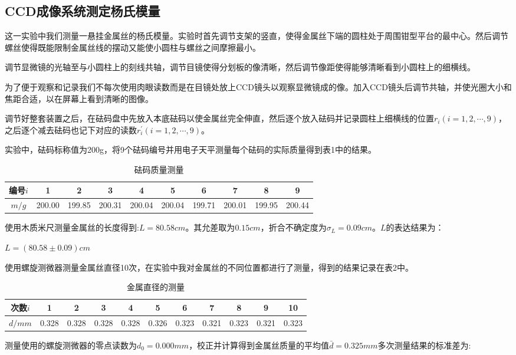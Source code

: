 \documentclass[a4 paper,12pt]{article}
\begin{document}
\subsection{CCD成像系统测定杨氏模量}
这一实验中我们测量一悬挂金属丝的杨氏模量。实验时首先调节支架的竖直，使得金属丝下端的圆柱处于周围钳型平台的最中心。然后调节螺丝使得既能限制金属丝线的摆动又能使小圆柱与螺丝之间摩擦最小。
\par 调节显微镜的光轴至与小圆柱上的刻线共轴，调节目镜使得分划板的像清晰，然后调节像距使得能够清晰看到小圆柱上的细横线。
\par 为了便于观察和记录我们不每次使用肉眼读数而是在目镜处放上CCD镜头以观察显微镜成的像。加入CCD镜头后调节共轴，并使光圈大小和焦距合适，以在屏幕上看到清晰的图像。
\par 调节好整套装置之后，在砝码盘中先放入本底砝码以使金属丝完全伸直，然后逐个放入砝码并记录圆柱上细横线的位置$r_{i}(i=1,2,\cdots,9)$，之后逐个减去砝码也记下对应的读数$r_{i}^{\prime}(i=1,2,\cdots,9)$。
\par 实验中，砝码标称值为200g，将9个砝码编号并用电子天平测量每个砝码的实际质量得到表1中的结果。
\begin{table}[H]
	\caption{砝码质量测量}
	\label{砝码质量测量}
	\centering
	\begin{tabular}{c|*{9}{c}}
		\toprule[0.5mm]
		编号$i$&1&2&3&4&5&6&7&8&9\\
		\midrule
		$m/g$&200.00&199.85&200.31&200.04&200.04&199.71&200.01&199.95&200.44\\
		\bottomrule[0.5mm]
	\end{tabular}
\end{table}
使用木质米尺测量金属丝的长度得到:$L=80.58cm$。其允差取为$0.15cm$，折合不确定度为$\sigma_{L}=0.09cm$。$L$的表达结果为：
\begin{center}
	$L=(80.58\pm0.09)cm$
\end{center}
\par 使用螺旋测微器测量金属丝直径10次，在实验中我对金属丝的不同位置都进行了测量，得到的结果记录在表2中。
\begin{table}[H]
	\caption{金属直径的测量}
	\label{金属直径的测量}
	\centering
	\begin{tabular}{c|*{10}{c}}
		\toprule[0.5mm]
		次数$i$&1&2&3&4&5&6&7&8&9&10\\
		\midrule
		$d/mm$&0.328&0.328&0.328&0.328&0.326&0.323&0.321&0.323&0.321&0.323\\
		\bottomrule[0.5mm]
	\end{tabular}
\end{table}
测量使用的螺旋测微器的零点读数为$d_{0}=0.000mm$，校正并计算得到金属丝质量的平均值$\bar{d}=0.325mm$多次测量结果的标准差为:
\end{document}
